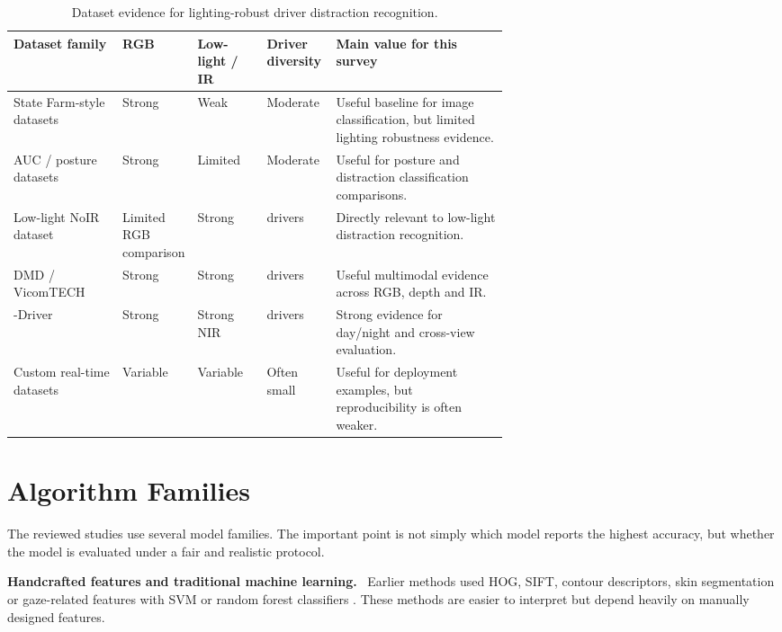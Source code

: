 \documentclass[11pt,a4paper]{article}
\let\oldsection\section
\renewcommand{\section}{\FloatBarrier\Needspace{9\baselineskip}\oldsection}
\newcommand{\focuspara}[1]{\par\medskip\noindent\textbf{#1.}\ }
\begin{document}
\begin{table}[H]
\centering
\caption{Dataset evidence for lighting-robust driver distraction recognition.}
\label{tab:dataset_evidence}
\small
\renewcommand{\arraystretch}{1.12}
\begin{tabularx}{\linewidth}{
>{\RaggedRight\arraybackslash}p{0.22\linewidth}
>{\RaggedRight\arraybackslash}p{0.14\linewidth}
>{\RaggedRight\arraybackslash}p{0.14\linewidth}
>{\RaggedRight\arraybackslash}p{0.14\linewidth}
>{\RaggedRight\arraybackslash}X}
\toprule
\textbf{Dataset family} & \textbf{RGB} & \textbf{Low-light / IR} & \textbf{Driver diversity} & \textbf{Main value for this survey} \\
\midrule
State Farm-style datasets & Strong & Weak & Moderate & Useful baseline for image classification, but limited lighting robustness evidence. \\
AUC / posture datasets & Strong & Limited & Moderate & Useful for posture and distraction classification comparisons. \\
Low-light NoIR dataset & Limited RGB comparison & Strong & 70 drivers & Directly relevant to low-light distraction recognition. \\
DMD / VicomTECH & Strong & Strong & 37 drivers & Useful multimodal evidence across RGB, depth and IR. \\
100-Driver & Strong & Strong NIR & 100 drivers & Strong evidence for day/night and cross-view evaluation. \\
Custom real-time datasets & Variable & Variable & Often small & Useful for deployment examples, but reproducibility is often weaker. \\
\bottomrule
\end{tabularx}
\normalsize
\end{table}

\section{Algorithm Families}

The reviewed studies use several model families. The important point is not simply which model reports the highest accuracy, but whether the model is evaluated under a fair and realistic protocol.

\focuspara{Handcrafted features and traditional machine learning}
Earlier methods used HOG, SIFT, contour descriptors, skin segmentation or gaze-related features with SVM or random forest classifiers \parencite{hssayeni2017,zhao2012postures}. These methods are easier to interpret but depend heavily on manually designed features.
\end{document}
